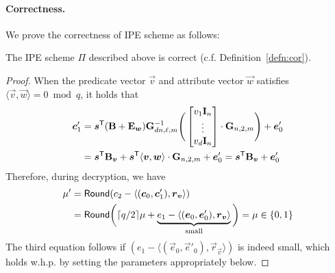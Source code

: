 \paragraph{Correctness.} We prove the correctness of IPE scheme as follows:
\begin{lemma}\label{lem:cor}
The IPE scheme $\Pi$ described above is correct (c.f. Definition~\ref{defn:cor}).
\end{lemma}
\begin{proof}
When the predicate vector $\vec{v}$ and attribute vector $\vec{w}$ satisfies $\langle \vec{v}, \vec{w} \rangle = 0 \bmod q$, it holds that
\begin{align*}
\boldsymbol{c}'_1 & = \boldsymbol{s}^{\mathsf{T}} (\mathbf{B} + \mathbf{E}_{\boldsymbol{w}}) \mathbf{G}_{dn, \ell, m}^{-1}
 \Bigg(\begin{bmatrix}
v_{1}\mathbf{I}_n \\
\vdots \\
v_{d}\mathbf{I}_n
\end{bmatrix} \cdot \mathbf{G}_{n, 2, m}\Bigg) + \boldsymbol{e}'_0 \\
& = \boldsymbol{s}^{\mathsf{T}} \mathbf{B}_{\boldsymbol{v}} + \boldsymbol{s}^{\mathsf{T}} \langle \boldsymbol{v}, \boldsymbol{w} \rangle \cdot \mathbf{G}_{n, 2, m} + \boldsymbol{e}'_0= \boldsymbol{s}^{\mathsf{T}} \mathbf{B}_{\boldsymbol{v}} + \boldsymbol{e}'_0
\end{align*}
Therefore, during decryption, we have
\begin{align*}
\mu' &= \mathsf{Round}(c_2 - \langle(\boldsymbol{c}_0, \boldsymbol{c}'_1), \boldsymbol{r}_{\boldsymbol{v}} \rangle) \\
     &= \mathsf{Round}\bigg(\lceil q / 2 \rceil \mu + \underbrace{e_1 - \langle (\boldsymbol{e}_0, \boldsymbol{e}'_0), \boldsymbol{r}_{\boldsymbol{v}} \rangle}_{\text{small}}\bigg) = \mu \in \{0,1\}
\end{align*}
The third equation follows if $(e_1 - \langle (\vec{e}_0, \vec{e}'_0), \vec{r}_{\vec{v}} \rangle)$ is indeed small, which holds w.h.p. by setting the parameters appropriately below.
\end{proof}

